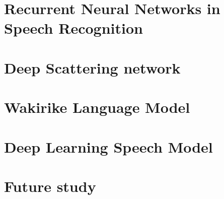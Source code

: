 \documentclass[12pt,twoside]{report}
\begin{document}
\chapter{Recurrent Neural Networks in Speech Recognition}\label{ch3RNN}


\chapter{Deep Scattering network}
\label{ch4DSN}

\chapter{Wakirike Language Model}


\chapter{Deep Learning Speech Model}


\chapter{Future study}





\end{document}
